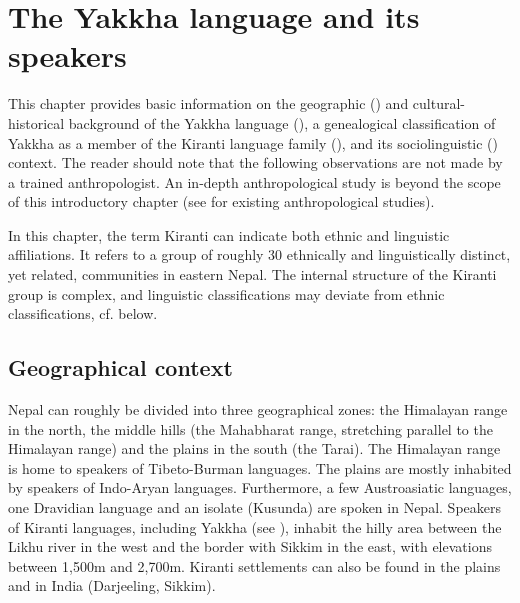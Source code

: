 ﻿\chapter{The Yakkha language and its speakers}\label{languageintro}
This chapter provides basic information on the geographic () and cultural-historical  background of the Yakkha language (), a genealogical classification of Yakkha as a member of the Kiranti language family (), and its sociolinguistic () context. The reader should note that the  following observations are not made by a trained anthropologist. An in-depth anthropological study is beyond the scope of this introductory chapter (see  for existing anthropological studies). 

In this chapter, the term  Kiranti can indicate both ethnic and linguistic affiliations. It refers to a group of roughly 30 ethnically and linguistically distinct, yet related, communities in eastern Nepal. The internal structure of the Kiranti group is complex, and linguistic classifications may deviate from ethnic classifications, cf.  below.

\section{Geographical context}\label{geogr}

Nepal can roughly be divided into three geographical zones: the Himalayan range in the north, the middle hills (the Mahabharat range, stretching parallel to the Himalayan range) and the plains in the south (the Tarai). The Himalayan range is home to speakers of Tibeto-Burman languages. The plains are mostly inhabited by speakers of Indo-Aryan languages. Furthermore, a few Austroasiatic languages, one Dravidian language and an isolate (Kusunda) are spoken in Nepal. Speakers of Kiranti languages, including Yakkha (see ), inhabit the hilly area between the Likhu river in the west and the border with Sikkim in the east, with elevations between 1,500m and 2,700m. Kiranti  settlements can also be found in the plains and in India (Darjeeling, Sikkim). 

